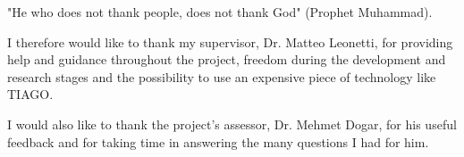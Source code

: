 "He who does not thank people, does not thank God" (Prophet Muhammad).

I therefore would like to thank my supervisor, Dr. Matteo Leonetti, for providing help and guidance throughout the project, freedom during the development and research stages and the possibility to use an expensive piece of technology like TIAGO.

I would also like to thank the project's assessor, Dr. Mehmet Dogar, for his useful feedback and for taking time in answering the many questions I had for him.